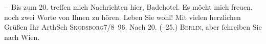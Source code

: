 \begin{ledgroupsized}[t]{13cm}
           \pstart
           – Bis zum 20. treffen mich Nachrichten hier, Badehotel. Es möcht mich freuen, noch zwei Worte von Ihnen zu
               hören.\pend
           \pstart Leben Sie wohl! Mit vielen herzlichen Grüßen Ihr \spacefill\mbox{ArthSch}\pend{}\pstart
           \textsc{Skodsborg}7/8 96. \pend
           \pstart
           Nach 20. (–25.) \textsc{Berlin}, aber ſchreiben Sie nach Wien.\pend
           
         
         \endnumbering{}\end{ledgroupsized}  \newcommand{\dateiname}{L00579}\newcommand{\titel}{Arthur Schnitzler an Hugo von Hofmannsthal, 7. 8. 1896}\newcommand{\editorInnen}{Martin Anton Müller und Gerd-Hermann Susen}
      